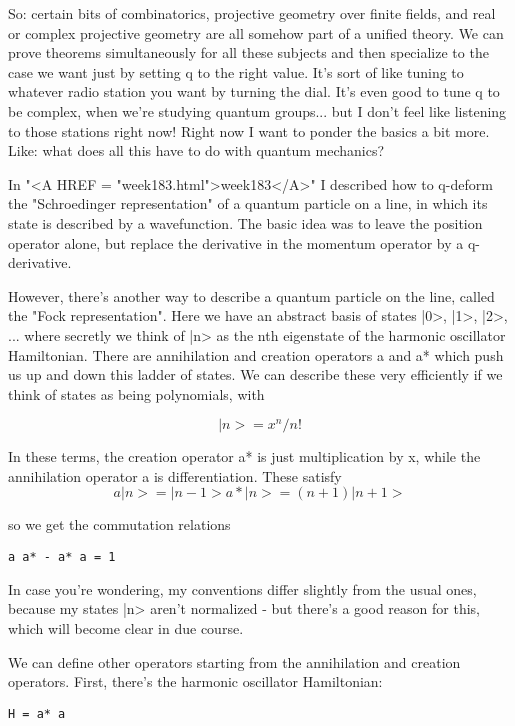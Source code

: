 So: certain bits of combinatorics, projective geometry over finite
fields, and real or complex projective geometry are all somehow part
of a unified theory.  We can prove theorems simultaneously for all
these subjects and then specialize to the case we want just by setting
q to the right value.  It's sort of like tuning to whatever radio
station you want by turning the dial.  It's even good to tune q to 
be complex, when we're studying quantum groups... but I don't feel like
listening to those stations right now!  Right now I want to ponder 
the basics a bit more.  Like: what does all this have to do with quantum 
mechanics?

In "<A HREF = "week183.html">week183</A>" I described how to q-deform the "Schroedinger
representation" of a quantum particle on a line, in which its state is
described by a wavefunction.  The basic idea was to leave the position
operator alone, but replace the derivative in the momentum operator by
a q-derivative.

However, there's another way to describe a quantum particle on the
line, called the "Fock representation".  Here we have an abstract
basis of states |0>, |1>, |2>, ... where secretly we think of |n> as
the nth eigenstate of the harmonic oscillator Hamiltonian.  There are
annihilation and creation operators a and a* which push us up and down
this ladder of states.  We can describe these very efficiently if
we think of states as being polynomials, with

$$
|n> = x^{n} / n!
$$
    
In these terms, the creation operator a* is just multiplication by x,
while the annihilation operator a is differentiation.  These satisfy
$$
 a|n>  =        |n-1>
a*|n>  =  (n+1) |n+1>
$$
    
so we get the commutation relations
\begin{verbatim}
a a* - a* a = 1 
\end{verbatim}
    
In case you're wondering, my conventions differ slightly from the
usual ones, because my states |n> aren't normalized - but there's a
good reason for this, which will become clear in due course.  

We can define other operators starting from the annihilation and
creation operators.  First, there's the harmonic oscillator Hamiltonian:

\begin{verbatim}
H = a* a
\end{verbatim}
    
